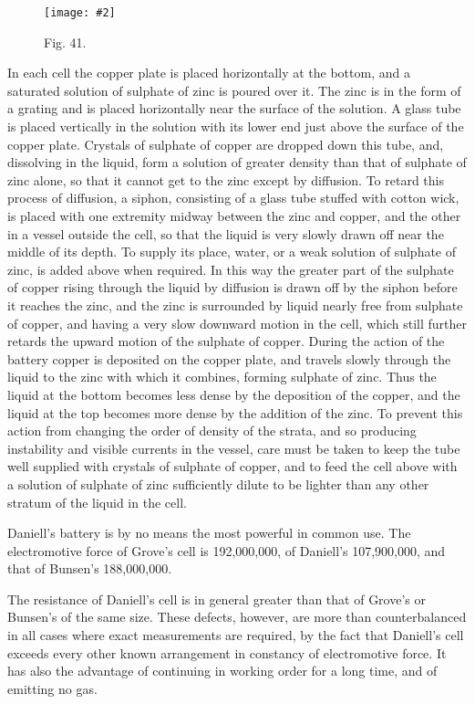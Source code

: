 \documentclass[12pt,oneside]{book}[2021/10/04]
\newcommand{\Runhead}[1]{\fancyhead[C]{\iffloatpage{}{\small#1}}}
\newcommand{\widefig}[3]{
\begin{figure}[ht!]
\centering
\texttt{[image: \#2]}
\caption*{\small #3}
\end{figure}}
\newcommand{\¬}{\hphantom{0}}
\begin{document}
\widefig{0.72}{171.png}{Fig. 41.}
In each cell the copper plate is placed horizontally at the bottom,
and a saturated solution of sulphate of zinc is poured over it. The
zinc is in the form of a grating and is placed horizontally near the
surface of the solution. A glass tube is placed vertically in the
solution with its lower end just above the surface of the copper
plate. Crystals of sulphate of copper are dropped down this tube,
and, dissolving in the liquid, form a solution of greater density
than that of sulphate of zinc alone, so that it cannot get to the
zinc except by diffusion. To retard this process of diffusion, a
siphon, consisting of a glass tube stuffed with cotton wick, is
placed with one extremity midway between the zinc and copper,
and the other in a vessel outside the cell, so that the liquid is
very slowly drawn off near the middle of its depth. To supply
its place, water, or a weak solution of sulphate of zinc, is added
above when required. In this way the greater part of the sulphate
of copper rising through the liquid by diffusion is drawn off by the
siphon before it reaches the zinc, and the zinc is surrounded by
liquid nearly free from sulphate of copper, and having a very slow
downward motion in the cell, which still further retards the upward
motion of the sulphate of copper. During the action of the battery
copper is deposited on the copper plate, and  travels slowly
through the liquid to the zinc with which it combines, forming
sulphate of zinc. Thus the liquid at the bottom becomes less dense
by the deposition of the copper, and the liquid at the top becomes
more dense by the addition of the zinc. To prevent this action
from changing the order of density of the strata, and so producing
instability and visible currents in the vessel, care must be taken to
keep the tube well supplied with crystals of sulphate of copper,
and to feed the cell above with a solution of sulphate of zinc sufficiently
dilute to be lighter than any other stratum of the liquid
in the cell.

Daniell's battery is by no means the most powerful in common
use. The electromotive force of Grove's cell is 192,000,000, of
Daniell's 107,900,000, and that of Bunsen's 188,000,000.

The resistance of Daniell's cell is in general greater than that of
Grove's or Bunsen's of the same size.
\Runhead{ELECTROMOTIVE FORCE OF BATTERIES.}
These defects, however, are more than counterbalanced in all
cases where exact measurements are required, by the fact that
Daniell's cell exceeds every other known arrangement in constancy
of electromotive force. It has also the advantage of continuing
in working order for a long time, and of emitting no gas.
\end{document}
